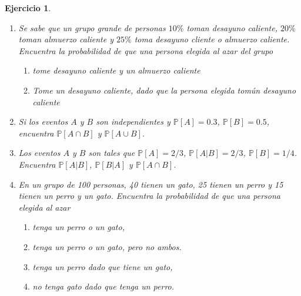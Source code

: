 \documentclass[12pt,twoside]{article}
\newtheorem{Ejer}{Ejercicio}
\newcommand{\Prob}{\mathbb{P}}
\begin{document}
\begin{Ejer}
\begin{enumerate}
\begin{enumerate}
\item Factor $Rh^{+}$ y tipo $A$,
\item Factor $Rh^{+}$ y tipo $AB$,
\item Factor $Rh^{+}$ y tipo $O$,
\item Factor $Rh^{-}$ y tipo B,
\item Factor $Rh^{-}$ y tipo $O$,
\end{enumerate}


\item Se sabe que un grupo grande de personas $10\%$ toman desayuno caliente, $20\%$ toman almuerzo caliente y $25\%$ toma desayuno cliente o almuerzo caliente. Encuentra la probabilidad de que una persona elegida al azar del grupo
\begin{enumerate}
\item tome desayuno caliente y un almuerzo caliente
\item Tome un desayuno caliente, dado que la persona elegida tom\' un desayuno caliente
\end{enumerate}

\item Si los eventos $A$ y $B$ son independientes y $\Prob\left[A\right]=0.3$, $\Prob\left[B\right]=0.5$, encuentra $\Prob\left[A\cap B\right]$ y $\Prob\left[A\cup B\right]$.

\item Los eventos $A$ y $B$ son tales que $\Prob\left[A\right]=2/3$, $\Prob\left[A|B\right]=2/3$, $\Prob\left[B\right]=1/4$. Encuentra $\Prob\left[A|B\right]$, $\Prob\left[B|A\right]$ y $\Prob\left[A\cap B\right]$.

\item En un grupo de 100 personas, 40 tienen un gato, 25 tienen un perro y 15 tienen un perro y un gato. Encuentra la probabilidad de que una persona elegida al azar
\begin{enumerate}
\item tenga un perro o un gato,
\item tenga un perro o un gato, pero no ambos.
\item tenga un perro dado que tiene un gato,
\item no tenga gato dado que tenga un perro.
\end{enumerate}
\end{enumerate}
\end{Ejer}
\end{document}
